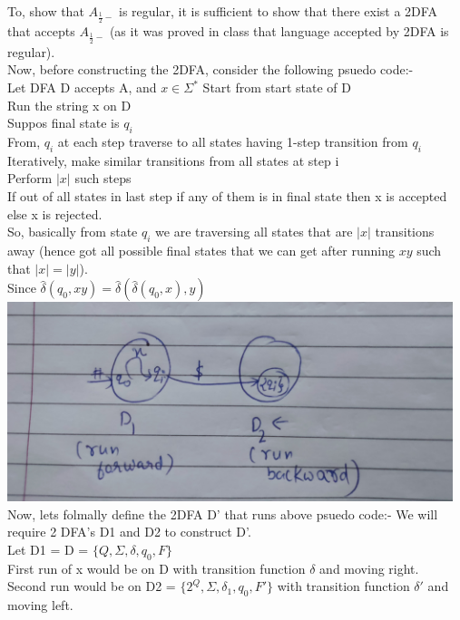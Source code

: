 \documentclass{article}
\begin{document}
To, show that $A_{\frac{1}{2}-}$ is regular, it is sufficient to show that there exist a 2DFA that accepts $A_{\frac{1}{2}-}$ (as it was proved in class that language accepted by 2DFA is regular).\\
Now, before constructing the 2DFA, consider the following psuedo code:- \\

Let DFA D accepts A, and $x \in \Sigma^*$
Start from start state of D\\
Run the string x on D\\
Suppos final state is $q_i$\\
From, $q_i$ at each step traverse to all states having 1-step transition from $q_i$\\
Iteratively, make similar transitions from all states at step i\\
Perform $|x|$ such steps\\
If out of all states in last step if any of them is in final state then x is accepted else x is rejected.\\

So, basically from state $q_i$ we are traversing all states that are $|x|$ transitions away (hence got all possible final states that we can get after running $xy$ such that $|x| = |y|$).\\
Since $\hat{\delta}(q_0,xy) = \hat{\delta}(\hat{\delta}(q_0,x),y)$\\

\includegraphics[width=13cm]{3.jpg}\\

Now, lets folmally define the 2DFA D' that runs above psuedo code:- 
We will require 2 DFA's D1 and D2 to construct D'.\\
Let D1 = D = $\{Q,\Sigma,\delta,q_0,F\}$\\
First run of x would be on D with transition function $\delta$ and moving right.\\
Second run would be on D2 = $\{2^Q,\Sigma,\delta_1,q_0,F'\}$ with transition function $\delta'$ and moving left.\\
\end{document}
